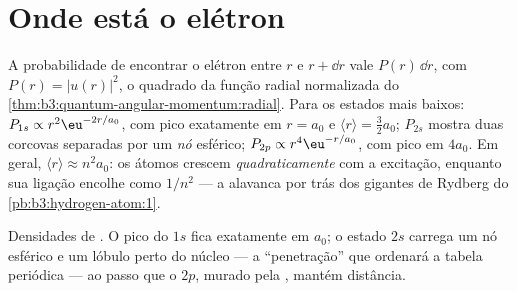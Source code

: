 \section{Onde está o elétron}

\begin{proposition}\label{prop:b3:hydrogen-atom:radial}
A probabilidade de encontrar o elétron entre $r$ e $r + \dd r$ vale
$P(r)\,\dd r$, com $P(r) = |u(r)|^2$, o quadrado da função radial
normalizada do \cref{thm:b3:quantum-angular-momentum:radial}. Para os estados mais baixos:
$P_{1s} \propto r^2\eu^{-2r/a_0}$, com pico exatamente em $r = a_0$ e
$\langle r\rangle = \tfrac32 a_0$; $P_{2s}$ mostra duas corcovas
separadas por um \emph{nó} esférico; $P_{2p} \propto
r^4\eu^{-r/a_0}$, com pico em $4a_0$. Em geral, $\langle r\rangle
\approx n^2a_0$: os átomos crescem \emph{quadraticamente} com a
excitação, enquanto sua ligação encolhe como $1/n^2$ --- a alavanca por
trás dos gigantes de Rydberg do \cref{pb:b3:hydrogen-atom:1}.
\end{proposition}
\admitted

\begin{omfigure}

{\small Densidades de . O pico do $1s$ fica
exatamente em $a_0$; o estado $2s$ carrega um nó esférico e um lóbulo
perto do núcleo --- a ``penetração'' que ordenará a tabela periódica
--- ao passo que o $2p$, murado pela , mantém
distância.}
\end{omfigure}

